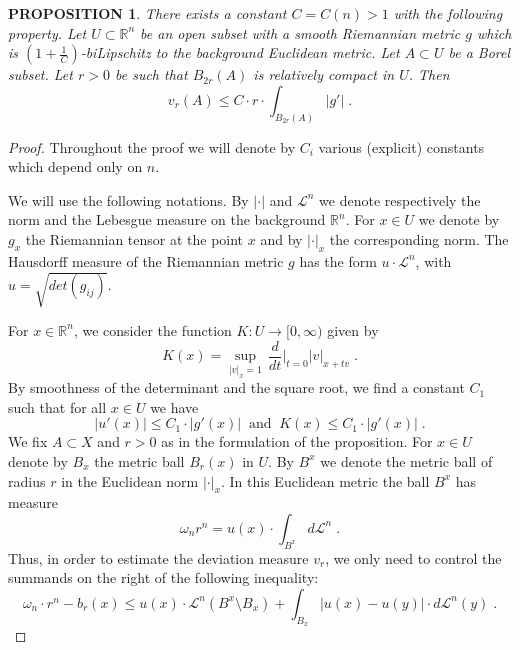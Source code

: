 \documentclass[12pt,leqno,intlimits]{amsart}
\numberwithin{equation}{section}
\newtheorem{prop}[thm]{PROPOSITION}
\theoremstyle{definition}
\theoremstyle{remark}
\newcommand{\R}{\mathbb{R}}
\def\eps{\varepsilon}
\def\:{\colon}
\begin{document}
\begin{prop}\label{prop-smooth}
There exists a constant $C=C(n)>1$ with the following property.
Let $U\subset \R^n$ be an open subset with a smooth Riemannian
metric $g$ which is $(1+\frac 1 C)$-biLipschitz to  the background Euclidean metric.
  Let $A\subset U$ be a Borel subset. Let $r>0$ be such that $B_{2r} (A)$ is relatively compact in $U$.
Then  $$v_r (A) \leq C \cdot r \cdot \int _{B_{2r} ( A)} |g' | \;.$$
\end{prop}



 \begin{proof}
Throughout the proof we will denote by $C_i$ various (explicit) constants which depend only on $n$.

We will use the following notations. By $|\cdot|$ and $\mathcal L^n$ we denote respectively the norm and the Lebesgue measure on the background $\R^n$.
 For $x\in U$ we denote by $g_x$ the Riemannian tensor at the point $x$ and
 by $|\cdot |_x$ the corresponding norm. %
The Hausdorff measure of the Riemannian metric
 $g$ has the form $u\cdot \mathcal L^n$, with $u=\sqrt {det (g_{ij})}$.




For $x\in \R^n$, we consider the function $K \:U\to [0,\infty)$ given by
$$K (x)=\sup _{|v|_x =1}\,  \frac d {dt}\Big |_{t=0} |v| _{x+tv} \; .$$
  By smoothness of the determinant and the square root,
we find a constant $C_1$ such that  for all $x\in U$  we have
\begin{equation} \label{eq:Kg}
|u' (x)|  \leq C_1\cdot  |g' (x)|  \; \;  \text{and}  \; \;  K (x)  \leq C_1 \cdot  |g' (x)|  \;.
\end{equation}
 We fix $A\subset X$ and $r>0$ as in the formulation of the proposition. For $x\in U$ denote by $B_x$
 the metric ball $B_r(x)$ in $U$.  By $B^x$ we denote the metric ball of radius $r$ in the Euclidean  norm $|\cdot |_x$.  In this Euclidean metric the ball $B^x$ has measure
 $$\omega _n r^n =u(x)\cdot \int _{B^x} d\mathcal L^n \;.$$
Thus, in order to estimate the deviation measure $v_r$, we only need to control the summands on the right of the following  inequality:
\begin{equation} \label{eq:summand}
\omega _n \cdot r^n - b_r (x) \leq  u(x) \cdot \mathcal L^n(  B^x\setminus B_x)   + \int _{B_x}  |u(x)-  u(y)| \cdot
d\mathcal  L^n (y)   \; .
\end{equation}




\end{proof}
\end{document}
